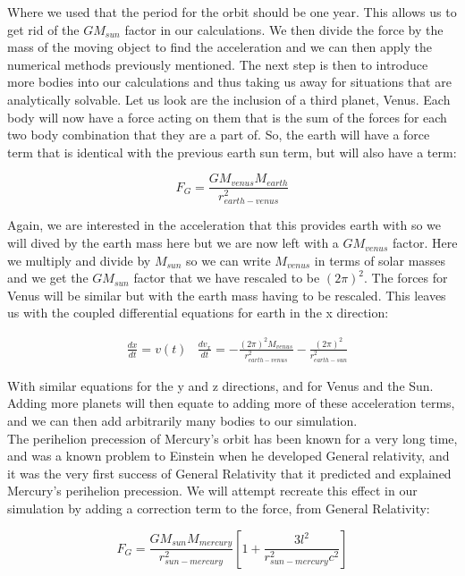 \documentclass[a4paper,11pt]{article}
\begin{document}
{Where we used that the period for the orbit should be one year. This allows us to get rid of the $G M_{sun}$ factor in our calculations. We then divide the force by the mass of the moving object to find the acceleration and we can then apply the numerical methods previously mentioned. The next step is then to introduce more bodies into our calculations and thus taking us away for situations that are analytically solvable. Let us look are the inclusion of a third planet, Venus. Each body will now have a force acting on them that is the sum of the forces for each two body combination that they are a part of. So, the earth will have a force term that is identical with the previous earth sun term, but will also have a term:

\begin{equation}
F_G = \frac{G M_{venus} M_{earth}}{r_{earth-venus}^2}
\label{2bodygrav_ve}
\end{equation}

Again, we are interested in the acceleration that this provides earth with so we will dived by the earth mass here but we are now left with a $G M_{venus}$ factor. Here we multiply and divide by $M_{sun}$ so we can write $M_{venus}$ in terms of solar masses and we get the $G M_{sun}$ factor that we have rescaled to be $(2\pi)^2$. The forces for Venus will be similar but with the earth mass having to be rescaled. This leaves us with the coupled differential equations for earth in the x direction:

\begin{align}
& \frac{dx}{dt} = v(t)
& \frac{d v_x}{dt} = - \frac{(2\pi)^2 M_{venus}}{r_{earth-venus}^2} - \frac{(2\pi)^2 }{r_{earth-sun}^2}
\label{eqofmotion}
\end{align}

With similar equations for the y and z directions, and for Venus and the Sun. Adding more planets will then equate to adding more of these acceleration terms, and we can then add arbitrarily many bodies to our simulation.\\

The perihelion precession of Mercury's orbit has been known for a very long time, and was a known problem to Einstein when he developed General relativity, and it was the very first success of General Relativity that it predicted and explained Mercury's perihelion precession. We will attempt recreate this effect in our simulation by adding a correction term to the force, from General Relativity:

\begin{equation}
F_G = \frac{G M_{sun} M_{mercury}}{r_{sun-mercury}^2} \left[ 1 + \frac{3 l^2}{r_{sun-mercury}^2 c^2} \right]
\label{2bodygrav_GR}
\end{equation}

}
\end{document}

